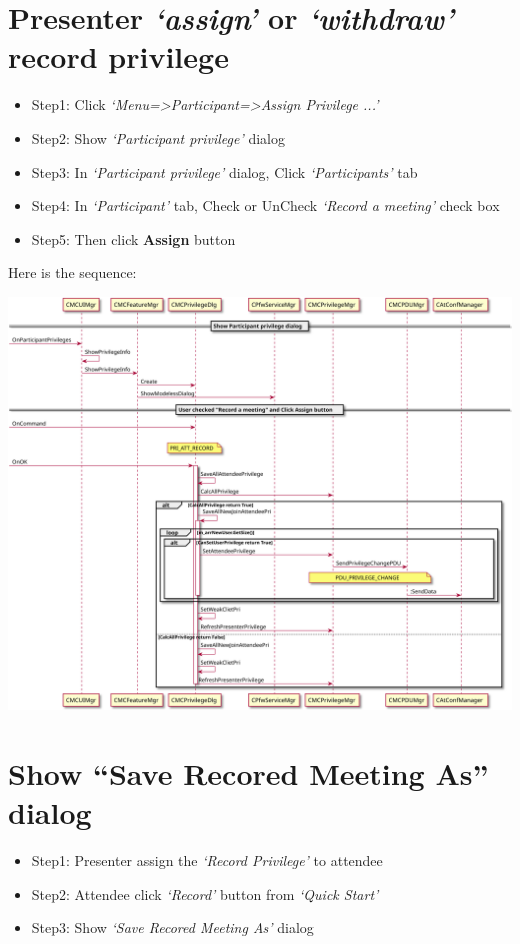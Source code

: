 \documentclass[letterpaper,10pt,english]{sphinxmanual}
\begin{document}
\section{Presenter \emph{`assign'} or \emph{`withdraw'} record privilege}
\label{record_logic:presenter-assign-or-withdraw-record-privilege}\begin{itemize}
\item {} 
Step1: Click \emph{`Menu=\textgreater{}Participant=\textgreater{}Assign Privilege ...'}

\item {} 
Step2: Show \emph{`Participant privilege'} dialog

\item {} 
Step3: In \emph{`Participant privilege'} dialog, Click \emph{`Participants'} tab

\item {} 
Step4: In \emph{`Participant'} tab, Check or UnCheck \emph{`Record a meeting'} check box

\item {} 
Step5: Then click \textbf{Assign} button

\end{itemize}

Here is the sequence:

\includegraphics{record_presenter_assign_privilege_seq.svg}


\section{Show ``Save Recored Meeting As'' dialog}
\label{record_logic:show-save-recored-meeting-as-dialog}\begin{itemize}
\item {} 
Step1: Presenter assign the \emph{`Record Privilege'} to attendee

\item {} 
Step2: Attendee click \emph{`Record'} button from \emph{`Quick Start'}

\item {} 
Step3: Show \emph{`Save Recored Meeting As'} dialog

\end{itemize}
\end{document}

